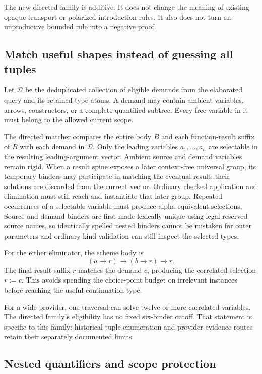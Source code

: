 \documentclass[11pt]{article}
\begin{document}
The new directed family is additive. It does not change the meaning of
existing opaque transport or polarized introduction rules. It also does not
turn an unproductive bounded rule into a negative proof.

\subsection{Match useful shapes instead of guessing all tuples}

Let $\mathcal D$ be the deduplicated collection of eligible demands from the
elaborated query and its retained type atoms. A demand may contain ambient
variables, arrows, constructors, or a complete quantified subtree. Every free
variable in it must belong to the allowed current scope.

The directed matcher compares the entire body $B$ and each function-result
suffix of $B$ with each demand in $\mathcal D$. Only the leading variables
$a_1,\ldots,a_n$ are selectable in the resulting leading-argument vector.
Ambient source and demand variables remain rigid. When a result spine exposes
a later context-free universal group, its temporary binders may participate
in matching the eventual result; their solutions are discarded from the
current vector. Ordinary checked application and elimination must still reach
and instantiate that later group. Repeated occurrences of a selectable variable must
produce alpha-equivalent selections. Source and demand binders are first
made lexically unique using legal reserved source names, so identically
spelled nested binders cannot be mistaken for outer parameters and ordinary
kind validation can still inspect the selected types.

For the either eliminator, the scheme body is
\[
 (a\to r)\to(b\to r)\to r.
\]
The final result suffix $r$ matches the demand $c$, producing the correlated
selection $r:=c$. This avoids spending the choice-point budget on irrelevant
instances before reaching the useful continuation type.

For a wide provider, one traversal can solve twelve or more correlated
variables. The directed family's eligibility has no fixed six-binder cutoff.
That statement is specific to this family: historical tuple-enumeration and
provider-evidence routes retain their separately documented limits.

\subsection{Nested quantifiers and scope protection}
\end{document}

